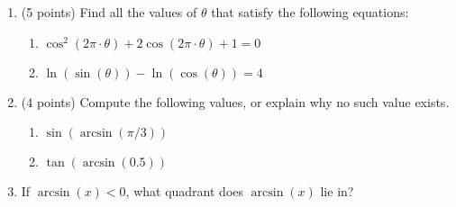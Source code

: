 \documentclass{article}
\begin{document}
\begin{enumerate}
  \newpage
\item (5 points) Find all the values of $\theta$ that satisfy the following equations:
  \begin{enumerate}
    \setlength\itemsep{15em}
  \item $\cos^2(2\pi \cdot \theta) + 2\cos(2\pi\cdot \theta) + 1 = 0$
  \item $\ln(\sin(\theta)) - \ln(\cos(\theta)) = 4$
    \vspace{15em}
  \end{enumerate}
\item (4 points) Compute the following values, or explain why no such value exists.
  \begin{enumerate}
    \setlength\itemsep{10em}
  \item $\sin(\arcsin(\pi/3))$
  \item $\tan(\arcsin(0.5))$
    \vspace{10em}
  \end{enumerate}
\item If $\arcsin(x) < 0$, what quadrant does $\arcsin(x)$ lie in?
\end{enumerate}
\end{document}
